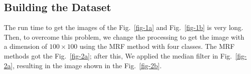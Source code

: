 \documentclass[
  journal,
]{IEEEtran}%
\begin{document}
\begin{figure}
\begin{minipage}{0.50\linewidth}
{}


\end{minipage}%

\end{figure}%

\subsection{Building the Dataset}\label{building-the-dataset}

The run time to get the images of the Fig.~\ref{fig-1a} and
Fig.~\ref{fig-1b} is very long. Then, to overcome this problem, we
change the processing to get the image with a dimension of
\(100\times 100\) using the MRF method with four classes. The MRF
methods got the Fig.~\ref{fig-2a}; after this, We applied the median
filter in Fig.~\ref{fig-2a}, resulting in the image shown in the
Fig.~\ref{fig-2b}.

\begin{figure}

\begin{minipage}{0.50\linewidth}



\end{minipage}%
%
\begin{minipage}{0.50\linewidth}



\end{minipage}%

\end{figure}%
\end{document}
